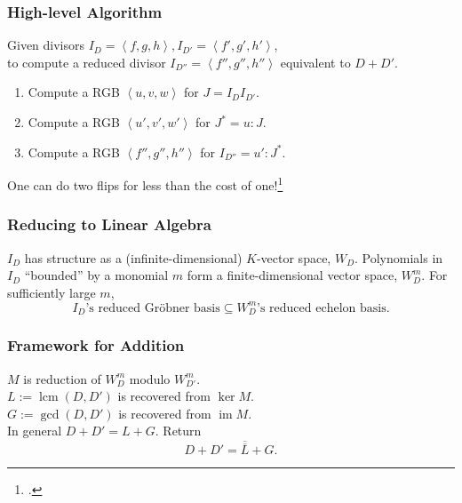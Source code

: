 \documentclass{beamer}
\newcommand{\pid}[1]{\left\langle #1 \right\rangle}
\DeclareMathOperator{\im}{im}
\DeclareMathOperator{\lcm}{lcm}
\renewcommand{\bar}{\overline}
\begin{document}

\begin{frame}
\frametitle{High-level Algorithm}
  Given divisors $I_D = \pid{f, g, h}, I_{D'} = \pid{f', g', h'}$,\\
  to compute a reduced divisor $I_{D''} = \pid{f'', g'', h''}$ equivalent to $D + D'$.
  \begin{enumerate}
    \item Compute a RGB $\pid{u, v, w}$ for $J = I_D I_{D'}$.
    \item Compute a RGB $\pid{u', v', w'}$ for $J^* = u : J$.
    \item Compute a RGB $\pid{f'', g'', h''}$ for $I_{D''} = u' : J^*$.
  \end{enumerate}
  \vspace{10pt}
  One can do two flips for less than the cost of one!\footcite{kamal18}
\end{frame}


\begin{frame}
\frametitle{Reducing to Linear Algebra}
  $I_D$ has structure as a (infinite-dimensional) $K$-vector space, $W_D$.
  \vspace{10pt}
  Polynomials in $I_D$ ``bounded'' by a monomial $m$ form a finite-dimensional vector space, $W_D^m$.
  \vspace{10pt}
  For sufficiently large $m$,
  \[ \text{$I_D$'s reduced Gr\"obner basis} \subseteq \text{$W_D^m$'s reduced echelon basis}. \]
\end{frame}


\begin{frame}[fragile]
\frametitle{Framework for Addition}
  \begin{center}
  \end{center}
  $M$ is reduction of $W_D^m$ modulo $W_{D'}^m$.\\
  \vspace{10pt}
  $L := \lcm(D, D')$ is recovered from $\ker M$.\\
  $G := \gcd(D, D')$ is recovered from $\im M$.\\
  \vspace{10pt}
  In general $D + D' = L + G$. Return\\
  \[D + D' = \bar{\bar L} + G.\]
\end{frame}
\end{document}
